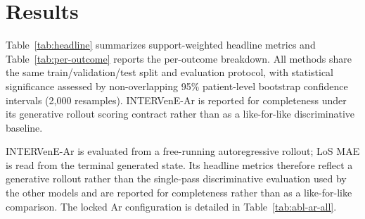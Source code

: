 \documentclass[letterpaper]{article} %
\begin{document}
\section{Results}

Table~\ref{tab:headline} summarizes support-weighted headline metrics and Table~\ref{tab:per-outcome} reports the per-outcome breakdown. All methods share the same train/validation/test split and evaluation protocol, with statistical significance assessed by non-overlapping 95\% patient-level bootstrap confidence intervals (2,000 resamples). INTERVenE-Ar is reported for completeness under its generative rollout scoring contract rather than as a like-for-like discriminative baseline.

\begin{table}[t]
  \caption{Headline patient-level performance on the MIMIC-IV diabetic cohort, support-weighted across the six outcomes. AUPRC$_w$ is the primary evaluation metric; AUROC$_w$ and F1$_w$ summarize discrimination; LoS is length-of-stay MAE (hours). Parameter counts correspond to the deployed models; for KarmaLego, the budget is the number of selected sparse TIRP features. Bold indicates the best result in each column.}
  \label{tab:headline}
  \centering

  \smallskip
  \footnotesize INTERVenE-Ar is evaluated from a free-running autoregressive rollout; LoS MAE is read from the terminal generated state. Its headline metrics therefore reflect a generative rollout rather than the single-pass discriminative evaluation used by the other models and are reported for completeness rather than as a like-for-like comparison. The locked Ar configuration is detailed in Table~\ref{tab:abl-ar-all}.
\end{table}
\end{document}
